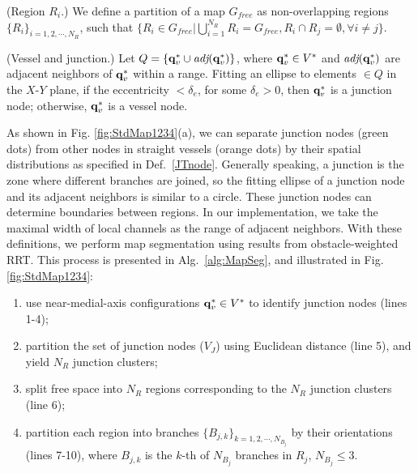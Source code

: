 \begin{definition}
	{\normalfont (Region $R_i$.)} We define a partition of a map $G_{free}$ as non-overlapping regions $\{R_i\}_{i = 1,2,\dotsm, N_R}$, such that $\{ R_i\in G_{free}|\bigcup\limits_{i=1}^{N_R}R_i = G_{free}, R_i\cap R_j = \emptyset, \forall i\neq j \}$.
\end{definition}

\begin{definition}\label{JTnode}
	{\normalfont (Vessel and junction.)}  Let $Q = \{{\bf q}^*_v  \cup \textit{adj}({\bf q}^*_v )\}$, where  ${\bf q}^*_v \in V^*$ and $\textit{adj}({\bf q}^*_v)$ are adjacent neighbors of ${\bf q}^*_v$ within a range. Fitting an ellipse to elements $\in Q$ in the $X$-$Y$ plane, if the eccentricity $<\delta_e$, for some $\delta_e>0$, then ${\bf q}^*_v$ is a junction node; otherwise, ${\bf q}^*_v$ is a vessel node.
\end{definition}

As shown in Fig. \ref{fig:StdMap1234}(a), we can separate junction nodes (green dots) from other nodes in straight vessels (orange dots) by their spatial distributions as specified in Def.\ \ref{JTnode}. Generally speaking, a junction is the zone where different branches are joined, so the fitting ellipse of a junction node and its adjacent neighbors is similar to a circle. 
These junction nodes can determine boundaries between regions. 
In our implementation, we take the maximal width of local channels as the range of adjacent neighbors.  
With these definitions, we perform map segmentation using results from obstacle-weighted RRT. 
This process is presented in Alg.\ \ref{alg:MapSeg}, and illustrated in Fig. \ref{fig:StdMap1234}:
\begin{enumerate}
	\item use near-medial-axis configurations ${\bf q}^*_v \in V^*$ to identify junction nodes (lines 1-4);
	\item partition the set of junction nodes ($V_J$) using Euclidean distance (line 5), and yield $N_R$ junction clusters;
	\item split free space into $N_R$ regions corresponding to the $N_R$ junction clusters (line 6);
	\item partition each region into branches $\{B_{j,k}\}_{k=1,2, \dotsm, N_{B_j}}$  by their orientations (lines 7-10), where $B_{j,k}$ is the $k$-th of $N_{B_j}$ branches in $R_j$, $N_{B_j}\le 3$. 
\end{enumerate}


